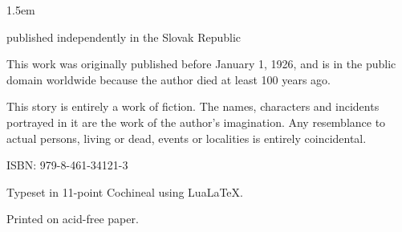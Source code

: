 \documentclass[]{novel}
\newcommand*{\midsloppy}{%
  \tolerance 5000%
  \hbadness 4000%
  \emergencystretch 1.5em}
\begin{document}
\midsloppy
\frenchspacing
{}
\setlength\parindent{1em}
\setlength\normalparindent{\parindent}
\frontmatter
\thispagestyle{empty}                   %
\vspace*{7\nbs}
\begin{center}
\par
\vspace{0.5\nbs}
\par
\end{center}
\clearpage

\thispagestyle{empty}
\null
\clearpage

\thispagestyle{empty}                   %
\vspace*{3\nbs}
\begin{center}
\par
\vspace{1.75\nbs}
\par
\vspace{1.75\nbs}

\vspace{3.5\nbs}
\vspace{5\nbs}
\vfill{}
published independently in the Slovak Republic
\end{center}
\clearpage

\thispagestyle{empty}                   %
\null\vfill
\begin{adjustwidth}{1.375em}{1.375em}
\begin{legalese}
\begin{center}
This work was originally published before January 1, 1926, and is in the public domain worldwide because the author died at least 100 years ago.

\null

This story is entirely a work of fiction. The names, characters and incidents portrayed in it are the work of the author’s imagination. Any resemblance to actual persons, living or dead, events or localities is entirely coincidental.

\null

ISBN: 979-8-461-34121-3

\null

Typeset in 11-point Cochineal using Lua\LaTeX{}.

\null

Printed on acid-free paper.
\end{center}
\end{legalese}
\end{adjustwidth}
\cleartorecto
\end{document}
